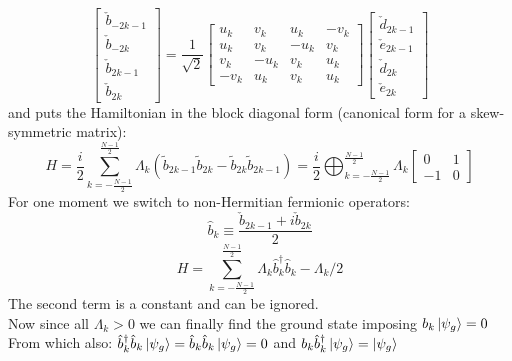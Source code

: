 \documentclass[10pt,a4paper]{article}
\begin{document}
\begin{equation}\label{eq:orthogonal}\left[\begin{array}{c}
\check{b}_{-2 k-1} \\
\check{b}_{-2 k} \\
\check{b}_{2 k-1} \\
\check{b}_{2 k}
\end{array}\right]=\frac{1}{\sqrt{2}}\left[\begin{array}{cccc}
u_{k} & v_{k} & u_{k} & -v_{k} \\
u_{k} & v_{k} & -u_{k} & v_{k} \\
v_{k} & -u_{k} & v_{k} & u_{k} \\
-v_{k} & u_{k} & v_{k} & u_{k}
\end{array}\right]\left[\begin{array}{c}
\check{d}_{2 k-1} \\
\check{e}_{2 k-1} \\
\check{d}_{2 k} \\
\check{e}_{2 k}
\end{array}\right]\end{equation}	
and puts the Hamiltonian in the block diagonal form (canonical form for a skew-symmetric matrix):
\begin{equation}H=\frac{i}{2} \sum_{k=-\frac{N-1}{2}}^{\frac{N-1}{2}} \Lambda_k\left(\tilde{b}_{2 k-1} \tilde{b}_{2 k}-\tilde{b}_{2 k} \tilde{b}_{2 k-1}\right)=
\frac{i}{2}\bigoplus_{k=-\frac{N-1}{2}}^{\frac{N-1}{2}} \Lambda_k\left[\begin{array}{cc}
0 & 1 \\
-1 & 0
\end{array}\right]\end{equation}	
For one moment we switch to non-Hermitian fermionic operators:
\begin{equation}\hat{b}_{k} \equiv \frac{\check{b}_{2 k-1}+i \check{b}_{2 k}}{2}\end{equation}
\begin{equation}
H= \sum_{k=-\frac{N-1}{2}}^{\frac{N-1}{2}} \Lambda_k\hat{b}_k^\dagger\hat{b}_k-\Lambda_k/2
\end{equation}
The second term is a constant and can be ignored.\\
Now since all $\Lambda_k>0$ we can finally find the ground state imposing
$b_k\ket{ \psi_g}=0$ \\ From which also: $\hat{b}_k^\dagger \hat{b}_k\ket{ \psi_g}=\hat{b}_k \hat{b}_k\ket{ \psi_g}=0$ and  $b_k \hat{b}_k^\dagger\ket{\psi_g}=\ket{\psi_g}$ \\
\end{document}
